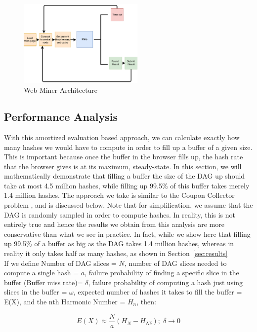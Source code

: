 \documentclass[runningheads]{llncs}
\begin{document}
\begin{figure}[h]
\centering
\includegraphics[width=230px,keepaspectratio]{Hybrid-Miner.pdf}
\caption{\label{fig:hybridArchitecture} Web Miner Architecture}
\end{figure}

\subsection{Performance Analysis}
With this amortized evaluation based approach, we can calculate exactly how many hashes we would have to compute in order to fill up a buffer of a given size. This is important because once the buffer in the browser fills up, the hash rate that the browser gives is at its maximum, steady-state. In this section, we will mathematically demonstrate that filling a buffer the size of the DAG up should take at most 4.5 million hashes, while filling up 99.5\% of this buffer takes merely 1.4 million hashes. 
The approach we take is similar to the Coupon Collector problem \cite{couponCollector}, and is discussed below. Note that for simplification, we assume that the DAG is randomly sampled in order to compute hashes. In reality, this is not entirely true and hence the results we obtain from this analysis are more conservative than what we see in practice. In fact, while we show here that filling up 99.5\% of a buffer as big as the DAG takes 1.4 million hashes, whereas in reality it only takes half as many hashes, as shown in Section~\ref{sec:results} \\



If we define Number of DAG slices = $N$, number of DAG slices needed to compute a single hash = $a$, failure probability of finding a specific slice in the buffer (Buffer miss rate)= $\delta$, failure probability of computing a hash just using slices in the buffer = $\omega$, expected number of hashes it takes to fill the buffer = E(X), and the nth Harmonic Number = $H_n$, then: \\
\begin{claim}
\begin{equation}
	E(X) \approx \frac{N}{a}(H_{N} -H_{N\delta});\;\delta \to 0
\end{equation}
\end{claim} 
\end{document}
